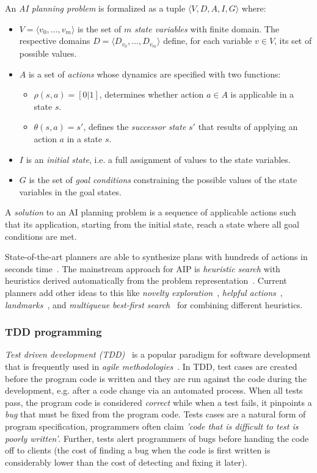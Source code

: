 \documentclass[10pt,a4paper]{paper}
\newcommand{\tup}[1]{{\langle #1 \rangle}}
\begin{document}
An {\em AI planning problem} is formalized as a tuple $\tup{V,D,A,I,G}$ where:
\begin{itemize}
\item $V=\tup{v_0, \ldots, v_m}$ is the set of $m$ {\em state variables} with finite domain. The respective domains $D=\tup{D_{v_0}, \ldots, D_{v_m}}$ define, for each variable $v\in V$, its set of possible values.
\item $A$ is a set of {\em actions} whose dynamics are specified with two functions:
\begin{itemize}
\item $\rho(s,a)=[0|1]$, determines whether action $a\in A$ is applicable in a state $s$.
\item $\theta(s,a)=s'$, defines the {\em successor state} $s'$ that results of applying an action $a$ in a state $s$.
\end{itemize}  
\item $I$ is an {\em initial state}, i.e. a full assignment of values to the state variables.
\item $G$ is the set of {\em goal conditions} constraining the possible values of the state variables in the goal states.  
\end{itemize}
A {\em solution} to an AI planning problem is a sequence of applicable actions such that its application, starting from the initial state, reach a state where all goal conditions are met.

State-of-the-art planners are able to synthesize plans with hundreds of actions in seconds time~\cite{geffner2013concise}.  The mainstream approach for AIP is {\em heuristic search} with heuristics derived automatically from the problem representation~\cite{mcdermott1996heuristic,bonet2001planning}.  Current planners add other ideas to this like {\it novelty exploration}~\cite{geffner:psimulators:IJCAI17}, {\it helpful actions}~\cite{hoffmann2001ff}, {\it landmarks}~\cite{helmert2006fast}, and {\it multiqueue best-first search}~\cite{richter2010lama} for combining different heuristics.

\subsubsection{TDD programming}
{\em Test driven development (TDD)}~\cite{beck:TDD:2003} is a popular paradigm for software development that is frequently used in {\it agile methodologies}~\cite{cohen2003agile}. In TDD, test cases are created before the program code is written and they are run against the code during the development, e.g. after a code change via an automated process. When all tests pass, the program code is considered {\em correct} while when a test fails, it pinpoints a {\em bug} that must be fixed from the program code. Tests cases are a natural form of program specification, programmers often claim {\em 'code that is difficult to test is poorly written'}. Further, tests alert programmers of bugs before handing the code off to clients (the cost of finding a bug when the code is first written is considerably lower than the cost of detecting and fixing it later).
\end{document}
